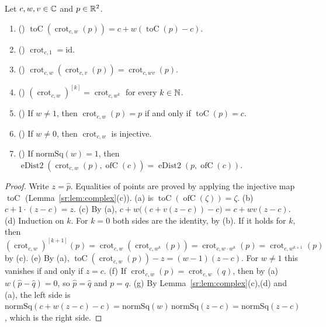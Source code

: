 \begin{lemma}\label{sr:lem:crot}
Let $c,w,v\in\mathbb C$ and $p\in\mathbb R^2$.
\begin{enumerate}[label=(\alph*)]
\item () $\operatorname{toC}(\operatorname{crot}_{c,w}(p))=c+w(\operatorname{toC}(p)-c)$.
\item () $\operatorname{crot}_{c,1}=\mathrm{id}$.
\item () $\operatorname{crot}_{c,w}(\operatorname{crot}_{c,v}(p))=\operatorname{crot}_{c,wv}(p)$.
\item () $(\operatorname{crot}_{c,w})^{[k]}=\operatorname{crot}_{c,w^k}$ for every $k\in\mathbb N$.
\item () If $w\ne1$, then $\operatorname{crot}_{c,w}(p)=p$ if and only if
  $\operatorname{toC}(p)=c$.
\item () If $w\ne0$, then $\operatorname{crot}_{c,w}$ is injective.
\item () If $\mathrm{normSq}(w)=1$, then
  $\operatorname{eDist2}(\operatorname{crot}_{c,w}(p),\operatorname{ofC}(c))=
  \operatorname{eDist2}(p,\operatorname{ofC}(c))$.
\end{enumerate}
\end{lemma}

\begin{proof}
Write $z=\hat p$. Equalities of points are proved by applying the injective map $\operatorname{toC}$
(Lemma~\ref{sr:lem:complex}(c)). (a) is $\operatorname{toC}(\operatorname{ofC}(\zeta))=\zeta$. (b) $c+1\cdot(z-c)=z$.
(c) By (a), $c+w\bigl((c+v(z-c))-c\bigr)=c+wv(z-c)$. (d) Induction on $k$. For $k=0$ both sides are the identity, by
(b). If it holds for $k$, then $(\operatorname{crot}_{c,w})^{[k+1]}(p)=\operatorname{crot}_{c,w}(\operatorname{crot}_{c,w^k}(p))
=\operatorname{crot}_{c,w\cdot w^k}(p)=\operatorname{crot}_{c,w^{k+1}}(p)$ by (c). (e) By (a),
$\operatorname{toC}(\operatorname{crot}_{c,w}(p))-z=(w-1)(z-c)$. For $w\ne1$ this vanishes if and only if $z=c$. (f) If
$\operatorname{crot}_{c,w}(p)=\operatorname{crot}_{c,w}(q)$, then by (a) $w(\hat p-\hat q)=0$, so $\hat p=\hat q$ and
$p=q$. (g) By Lemma~\ref{sr:lem:complex}(c),(d) and (a), the left side is $\mathrm{normSq}(c+w(z-c)-c)=
\mathrm{normSq}(w)\,\mathrm{normSq}(z-c)=\mathrm{normSq}(z-c)$, which is the right side.
\end{proof}

